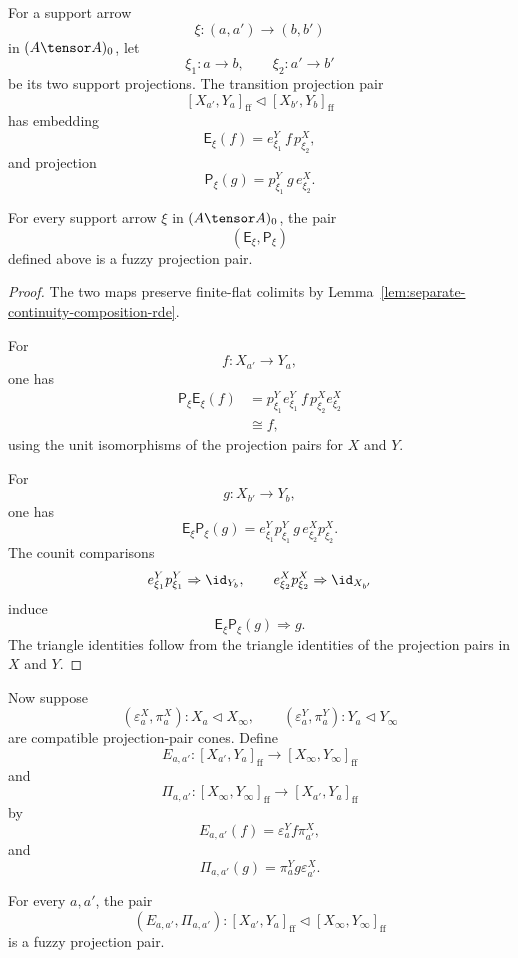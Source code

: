 For a support arrow
\[
    \xi:(a,a')\to(b,b')
\]
in \((A\tensor A)_0\), let
\[
    \xi_1:a\to b,
    \qquad
    \xi_2:a'\to b'
\]
be its two support projections.  The transition projection pair
\[
    [X_{a'},Y_a]_{\mathrm{ff}}
    \triangleleft
    [X_{b'},Y_b]_{\mathrm{ff}}
\]
has embedding
\[
    \mathsf E_\xi(f)
    =
    e^Y_{\xi_1}\, f\, p^X_{\xi_2},
\]
and projection
\[
    \mathsf P_\xi(g)
    =
    p^Y_{\xi_1}\, g\, e^X_{\xi_2}.
\]

\begin{lemma}
\label{lem:internal-hom-transitions-projection-pairs}
For every support arrow \(\xi\) in \((A\tensor A)_0\), the pair
\[
    (\mathsf E_\xi,\mathsf P_\xi)
\]
defined above is a fuzzy projection pair.
\end{lemma}

\begin{proof}
The two maps preserve finite-flat colimits by
Lemma~\ref{lem:separate-continuity-composition-rde}.

For
\[
    f:X_{a'}\to Y_a,
\]
one has
\[
\begin{aligned}
    \mathsf P_\xi\mathsf E_\xi(f)
    &=
    p^Y_{\xi_1}e^Y_{\xi_1}\, f\,
    p^X_{\xi_2}e^X_{\xi_2}
    \\
    &\cong
    f,
\end{aligned}
\]
using the unit isomorphisms of the projection pairs for \(X\) and \(Y\).

For
\[
    g:X_{b'}\to Y_b,
\]
one has
\[
    \mathsf E_\xi\mathsf P_\xi(g)
    =
    e^Y_{\xi_1}p^Y_{\xi_1}\, g\,
    e^X_{\xi_2}p^X_{\xi_2}.
\]
The counit comparisons
\[
    e^Y_{\xi_1}p^Y_{\xi_1}\Rightarrow \id_{Y_b},
    \qquad
    e^X_{\xi_2}p^X_{\xi_2}\Rightarrow \id_{X_{b'}}
\]
induce
\[
    \mathsf E_\xi\mathsf P_\xi(g)
    \Rightarrow
    g.
\]
The triangle identities follow from the triangle identities of the projection
pairs in \(X\) and \(Y\).
\end{proof}

Now suppose
\[
    (\varepsilon_a^X,\pi_a^X):X_a\triangleleft X_\infty,
    \qquad
    (\varepsilon_a^Y,\pi_a^Y):Y_a\triangleleft Y_\infty
\]
are compatible projection-pair cones.  Define
\[
    E_{a,a'}:[X_{a'},Y_a]_{\mathrm{ff}}
    \to [X_\infty,Y_\infty]_{\mathrm{ff}}
\]
and
\[
    \Pi_{a,a'}:[X_\infty,Y_\infty]_{\mathrm{ff}}
    \to [X_{a'},Y_a]_{\mathrm{ff}}
\]
by
\[
    E_{a,a'}(f)=\varepsilon_a^Y f\pi_{a'}^X,
\]
and
\[
    \Pi_{a,a'}(g)=\pi_a^Y g\varepsilon_{a'}^X.
\]

\begin{lemma}
\label{lem:internal-hom-cone-components-projection-pairs}
For every \(a,a'\), the pair
\[
    (E_{a,a'},\Pi_{a,a'}):
    [X_{a'},Y_a]_{\mathrm{ff}}
    \triangleleft
    [X_\infty,Y_\infty]_{\mathrm{ff}}
\]
is a fuzzy projection pair.
\end{lemma}

